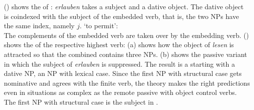 \noindent
() shows the \argstv of : \emph{erlauben} takes a subject and a dative
object. The dative object is coindexed with the subject of the embedded verb, that is, the two NPs
have the same index, namely $j$.
\ea
{} `to permit':\\
\z
The complements of the embedded verb  are taken over by the embedding verb. () shows
the \argstv of the respective highest verb:
\ea
\label{ex-arg-st-fernpassiv-object-control}
\z
(a) shows how the object of \emph{lesen} is attracted so that the combined \argst contains
three NPs. (b) shows the passive variant in which the subject of \emph{erlauben} is
suppressed. The result is a \argstl starting with a dative NP, an NP with lexical case. Since the
first NP with structural case gets nominative and agrees with the finite verb, the theory makes the
right predictions even in situations as complex as the remote passive with object control verbs. The
first NP with structural case is the subject in .










